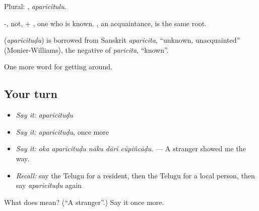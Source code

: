 Plural: , \emph{aparicitulu}.

-, not, + , one who is known. , an acquaintance, is the same root.

\begin{cousinweb}
\textbf{} (\emph{aparicituḍu}) is borrowed from Sanskrit \emph{aparicita}, \textquotedblleft{}unknown, unacquainted\textquotedblright{} (Monier-Williams), the negative of \emph{paricita}, \textquotedblleft{}known\textquotedblright{}.
\end{cousinweb}

\begin{grammarlens}[title={What you've built}]
One more word for getting around.
\end{grammarlens}

\subsection*{Your turn}
\begin{itemize}
\raggedright
  \item \emph{Say it:} \emph{aparicituḍu}
  \item \emph{Say it:} \emph{aparicituḍu}, once more
  \item \emph{Say it:} \emph{oka aparicituḍu nāku dāri cūpiñcāḍu.} — A stranger showed me the way.
  \item \emph{Recall:} say the Telugu for a resident, then the Telugu for a local person, then say \emph{aparicituḍu} again
\end{itemize}

\begin{tcolorbox}[breakable,colback=teal!4,colframe=teal!35!black,title={Before you move on}]
What does  mean? (\textquotedblleft{}A stranger\textquotedblright{}.) Say it once more.
\end{tcolorbox}
